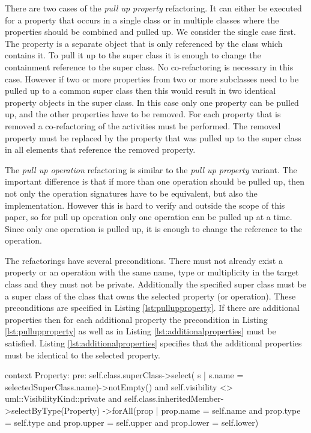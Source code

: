 \documentclass{llncs}
\begin{document}
There are two cases of the \textit{pull up property} refactoring. It can either be executed for a property that 
occurs in a single class or in multiple classes where the properties should be combined and pulled up. We consider the single case first. 
The property is a separate object that is only referenced by the class which contains it. To pull it up to the super class it is enough to 
change the containment reference to the super class. No co-refactoring is necessary in this case. However if two or more properties from 
two or more subclasses need to be pulled up to a common super class then this would result in two identical property objects in the super 
class. In this case only one property can be pulled up, and the other properties have to be removed. For each property that is removed a 
co-refactoring of the activities must be performed. The removed property must be replaced by the property that was pulled up to the super 
class in all elements that reference the removed property.

The \textit{pull up operation} refactoring is similar to the \textit{pull up property} variant. The important difference is that
if more than one operation should be pulled up, then not only the operation signatures have to be equivalent, but also the implementation.
However this is hard to verify and outside the scope of this paper, so for pull up operation only one operation can be pulled up at a 
time. Since only one operation is pulled up, it is enough to change the reference to the operation.

The refactorings have several preconditions. There must not already exist a property or an operation with the same name, type or 
multiplicity in the target class and they must not be private. Additionally the specified super class must be a super class of the
class that owns the selected property (or operation). These preconditions are specified in Listing \ref{lst:pullupproperty}. If there are 
additional properties then for each additional property the precondition in Listing \ref{lst:pullupproperty} as well as in Listing 
\ref{lst:additionalproperties} must be satisfied. Listing \ref{lst:additionalproperties} specifies that the additional properties must be
identical to the selected property.

\begin{lstsingle}[language=OCL,caption=OCL for \textit{pull up property},label=lst:pullupproperty]
context Property:
pre: self.class.superClass->select(
         s | s.name = selectedSuperClass.name)->notEmpty()
     and self.visibility <> uml::VisibilityKind::private
     and self.class.inheritedMember->selectByType(Property)
     ->forAll(prop | prop.name = self.name
              and prop.type = self.type
              and prop.upper = self.upper
              and prop.lower = self.lower)
\end{lstsingle}
\end{document}
